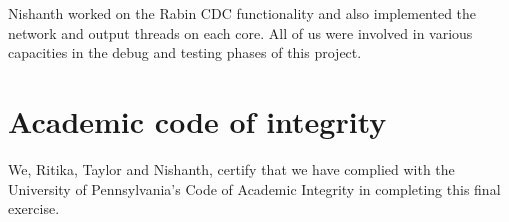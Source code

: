 \documentclass{article}
\begin{document}
\par
Nishanth worked on the Rabin CDC functionality and also implemented the network and output threads on each core. 
\newline\newline
All of us were involved in various capacities in the debug and testing phases of this project.  
\section{Academic code of integrity}
We, Ritika, Taylor and Nishanth, certify that we have complied with the University of Pennsylvania’s Code of Academic Integrity in completing this final exercise.
\end{document}
